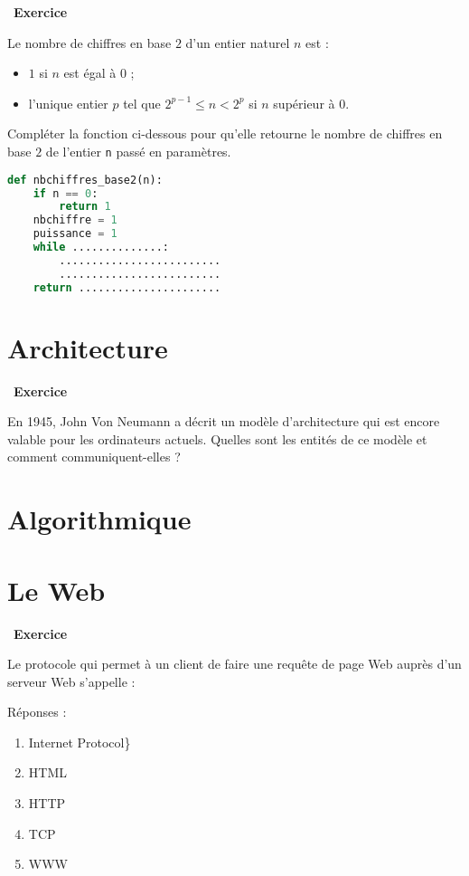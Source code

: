 \documentclass[
  11pt,
]{article}
\providecommand{\tightlist}{%
  \setlength{\itemsep}{0pt}\setlength{\parskip}{0pt}}
\newcounter{exo}
\newenvironment{exercice}[1]
{\par \medskip   \addtocounter{exo}{1} \noindent  
\begin{bclogo}[arrondi =0.1,   noborder = true, logo=\bccrayon, marge=4]{~\textbf{Exercice} \textbf{\theexo} {\itshape #1} }  \par}
{
\end{bclogo}
 \par \bigskip }
\newcounter{def}
\newcounter{alg}
\begin{document}
\begin{exercice}{}

Le nombre de chiffres en base \(2\) d'un entier naturel \(n\) est :

\begin{itemize}
\tightlist
\item
  \(1\) si \(n\) est égal à \(0\) ;
\item
  l'unique entier \(p\) tel que \(2^{p-1} \leqslant n < 2^{p}\) si \(n\)
  supérieur à \(0\).
\end{itemize}

Compléter la fonction ci-dessous pour qu'elle retourne le nombre de
chiffres en base \(2\) de l'entier \texttt{n} passé en paramètres.

\begin{lstlisting}[language=Python]
def nbchiffres_base2(n):
    if n == 0:
        return 1
    nbchiffre = 1
    puissance = 1
    while ..............:
        .........................
        .........................
    return ......................
\end{lstlisting}

\end{exercice}

\hypertarget{architecture}{%
\section{Architecture}\label{architecture}}

\begin{exercice}{}

En 1945, John Von Neumann a décrit un modèle d'architecture qui est
encore valable pour les ordinateurs actuels. Quelles sont les entités de
ce modèle et comment communiquent-elles ?

\end{exercice}

\hypertarget{algorithmique}{%
\section{Algorithmique}\label{algorithmique}}

\hypertarget{le-web}{%
\section{Le Web}\label{le-web}}

\begin{exercice}{}

Le protocole qui permet à un client de faire une requête de page Web
auprès d'un serveur Web s'appelle :

Réponses :

\begin{enumerate}
\def\labelenumi{\Alph{enumi})}
\tightlist
\item
  Internet Protocol\}
\item
  HTML
\item
  HTTP
\item
  TCP
\item
  WWW
\end{enumerate}

\end{exercice}
\end{document}
